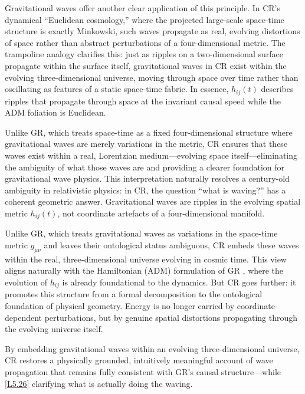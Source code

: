 \documentclass[12pt]{book}
\newcounter{logicanchor}
\newenvironment{logicanchorenv}[1]{\refstepcounter{logicanchor}\label{#1}}{}
\newcommand{\logiclink}[2]{\begin{logicanchorenv}{logic:#1}\end{logicanchorenv}\hyperref[appendix:#1]{[#1]}\xspace}
\begin{document}
Gravitational waves offer another clear application of this principle. In CR's dynamical ``Euclidean cosmology,'' where the projected large-scale space-time structure is exactly Minkowski, such waves propagate as real, evolving distortions of space rather than abstract perturbations of a four-dimensional metric. The trampoline analogy clarifies this: just as ripples on a two-dimensional surface propagate within the surface itself, gravitational waves in CR exist within the evolving three-dimensional universe, moving through space over time rather than oscillating as features of a static space-time fabric. In essence, $h_{ij}(t)$ describes ripples that propagate through space at the invariant causal speed while the ADM foliation is Euclidean.

Unlike GR, which treats space-time as a fixed four-dimensional structure where gravitational waves are merely variations in the metric, CR ensures that these waves exist within a real, Lorentzian medium---evolving space itself---eliminating the ambiguity of what those waves are and providing a clearer foundation for gravitational wave physics. This interpretation naturally resolves a century-old ambiguity in relativistic physics: in CR, the question ``what is waving?'' has a coherent geometric answer. Gravitational waves are ripples in the evolving spatial metric $h_{ij}(t)$, not coordinate artefacts of a four-dimensional manifold.

Unlike GR, which treats gravitational waves as variations in the space-time metric $g_{\mu\nu}$ and leaves their ontological status ambiguous, CR embeds these waves within the real, three-dimensional universe evolving in cosmic time. This view aligns naturally with the Hamiltonian (ADM) formulation of GR \citep{arnowitt2008}, where the evolution of $h_{ij}$ is already foundational to the dynamics. But CR goes further: it promotes this structure from a formal decomposition to the ontological foundation of physical geometry. Energy is no longer carried by coordinate-dependent perturbations, but by genuine spatial distortions propagating through the evolving universe itself.

By embedding gravitational waves within an evolving three-dimensional universe, CR restores a physically grounded, intuitively meaningful account of wave propagation that remains fully consistent with GR's causal structure---while \logiclink{L5.26}{} clarifying what is actually doing the waving.
\end{document}
